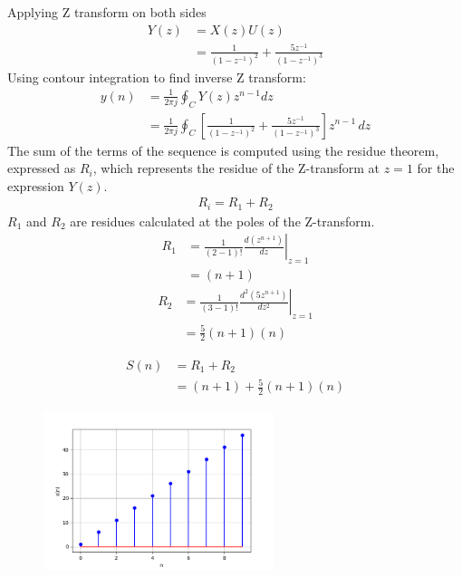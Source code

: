 \documentclass[journal,12pt,twocolumn]{IEEEtran}
\theoremstyle{remark}
\begin{document}
Applying Z transform on both sides
\begin{align}
	Y(z) &= X(z)U(z)\\
	&=\frac{1}{(1-z^{-1})^2} + \frac{5z^{-1}}{(1-z^{-1})^3}
\end{align}
Using contour integration to find inverse Z transform:
\begin{align}
	y(n) &= \frac{1}{2\pi j} \oint_C Y(z) z^{n-1} dz\\
	&= \frac{1}{2\pi j} \oint_C \left[ \frac{1}{(1-z^{-1})^2} + \frac{5z^{-1}}{(1-z^{-1})^3} \right]z^{n-1} \, dz
\end{align}
The sum of the terms of the sequence is computed using the residue theorem, expressed as $R_i$, which represents the residue of the Z-transform at $ z=1 $ for the expression $ Y(z) $.
\begin{align}
	R_i=R_1 + R_2
\end{align}
 $R_1$ and $R_2$ are residues calculated at the poles of the Z-transform.
\begin{align}
		R_1 &= \frac{1}{{(2-1)!}} \left. \frac{d (z^{n+1})}{dz} \right|_{z=1} \\
	&=(n+1)
\end{align}
\begin{align}
	R_2 &= \frac{1}{{(3-1)!}} \left. \frac{d^2(5z^{n+1})}{dz^2} \right|_{z=1} \\
	&= \frac{5}{2}(n+1)(n)
\end{align}

\begin{align}
 S(n) &= R_1 + R_2\\
    &= (n+1) + \frac{5}{2}(n+1)(n)
\end{align}
\begin{figure}[h]
  \centering
  \includegraphics[width=0.6\textwidth]{figs/stem.png}
 
  \label{fig:Stem_Plot}
\end{figure}
\end{document}
